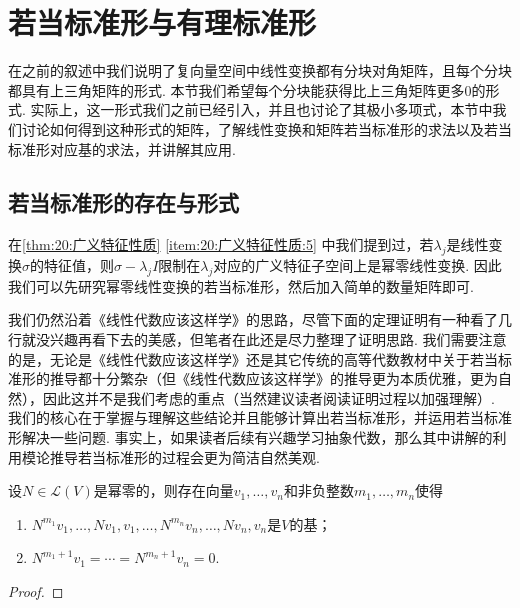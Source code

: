 \chapter{若当标准形与有理标准形}

在之前的叙述中我们说明了复向量空间中线性变换都有分块对角矩阵，且每个分块都具有上三角矩阵的形式. 本节我们希望每个分块能获得比上三角矩阵更多0的形式. 实际上，这一形式我们之前已经引入，并且也讨论了其极小多项式，本节中我们讨论如何得到这种形式的矩阵，了解线性变换和矩阵若当标准形的求法以及若当标准形对应基的求法，并讲解其应用.

\section{若当标准形的存在与形式}

在\autoref{thm:20:广义特征性质} \ref*{item:20:广义特征性质:5} 中我们提到过，若$\lambda_j$是线性变换$\sigma$的特征值，则$\sigma-\lambda_jI$限制在$\lambda_j$对应的广义特征子空间上是幂零线性变换. 因此我们可以先研究幂零线性变换的若当标准形，然后加入简单的数量矩阵即可.

我们仍然沿着《线性代数应该这样学》的思路，尽管下面的定理证明有一种看了几行就没兴趣再看下去的美感，但笔者在此还是尽力整理了证明思路. 我们需要注意的是，无论是《线性代数应该这样学》还是其它传统的高等代数教材中关于若当标准形的推导都十分繁杂（但《线性代数应该这样学》的推导更为本质优雅，更为自然），因此这并不是我们考虑的重点（当然建议读者阅读证明过程以加强理解）. 我们的核心在于掌握与理解这些结论并且能够计算出若当标准形，并运用若当标准形解决一些问题. 事实上，如果读者后续有兴趣学习抽象代数，那么其中讲解的利用模论推导若当标准形的过程会更为简洁自然美观.
\begin{theorem} \label{thm:22:若当基存在}
    设$N\in \mathcal{L}(V)$是幂零的，则存在向量$v_1,\ldots,v_n$和非负整数$m_1,\ldots,m_n$使得
    \begin{enumerate}[label=(\arabic*)]
        \item \label{item:22:若当基存在:1}
              $N^{m_1}v_1,\ldots,Nv_1,v_1,\ldots,N^{m_n}v_n,\ldots,Nv_n,v_n$是$V$的基；

        \item \label{item:22:若当基存在:2}
              $N^{m_1+1}v_1=\cdots=N^{m_n+1}v_n=0$.
    \end{enumerate}
\end{theorem}

\begin{proof}

\end{proof}


